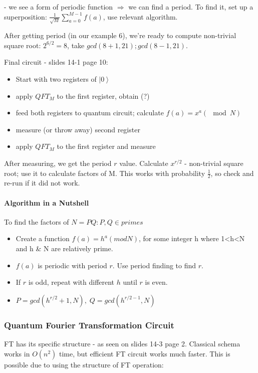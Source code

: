 \documentclass{scrartcl}
\newcommand{\ket}[1]{\left| #1 \right>} %
\newcommand{\means}{\Rightarrow} %
\begin{document}
- we see a form of periodic function $\means$ we can find a period. To find it,
set up a superposition: $\frac1{\sqrt{M}} \sum \limits_{a=0}^{M-1}f(a)$, use
relevant algorithm.

After getting period (in our example 6), we're ready to compute non-trivial
square root: $2^{6/2} = 8$, take $gcd(8+1, 21); gcd(8-1, 21)$.

Final circuit - slides 14-1 page 10:
\begin{itemize}
\item Start with two registers of $\ket0$
\item apply $QFT_M$ to the first register, obtain (?)
\item feed both registers to quantum circuit; calculate $f(a) = x^a (\mod N)$
\item measure (or throw away) second register
\item apply $QFT_M$ to the first register and measure
\end{itemize}

After measuring, we get the period $r$ value. Calculate $x^{r/2}$ - non-trivial
square root; use it to calculate factors of M. This works with probability
$\frac12$, so check and re-run if it did not work.

\paragraph{Algorithm in a Nutshell}

To find the factors of $N = PQ :P,Q \in {primes}$
\begin{itemize}
\item Create a function $f(a) = h^a (mod N)$, for some integer h where 1<h<N and
  h \& N are relatively prime.
\item $f(a)$ is periodic with period $r$. Use period finding to find $r$.
\item If $r$ is odd, repeat with different $h$ until $r$ is even.
\item $P = gcd(h^{r/2}+1,N),\; Q = gcd(h^{r/2-1}, N)$
\end{itemize}

\subsubsection{Quantum Fourier Transformation Circuit}
\label{sec:QFTCircuit}

FT has its specific structure - as seen on slides 14-3 page 2. Classical schema
works in $O(n^2)$ time, but efficient FT circuit works much faster. This is
possible due to using the structure of FT operation:
\end{document}
